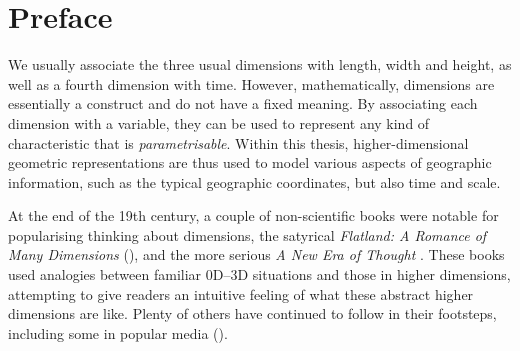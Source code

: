 
\chapter*{Preface}

We usually associate the three usual dimensions with length, width and height, as well as a fourth dimension with time. 
However, mathematically, dimensions are essentially a construct and do not have a fixed meaning.
By associating each dimension with a variable, they can be used to represent any kind of characteristic that is \emph{parametrisable}.
Within this thesis, higher-dimensional geometric representations are thus used to model various aspects of geographic information, such as the typical geographic coordinates, but also time and scale.

At the end of the 19th century, a couple of non-scientific books were notable for popularising thinking about dimensions, the satyrical \emph{Flatland: A Romance of Many Dimensions} \citep{Abbott84} (), and the more serious \emph{A New Era of Thought} \citep{Hinton88}.
These books used analogies between familiar 0D--3D situations and those in higher dimensions, attempting to give readers an intuitive feeling of what these abstract higher dimensions are like.
Plenty of others have continued to follow in their footsteps, including some in popular media ().

